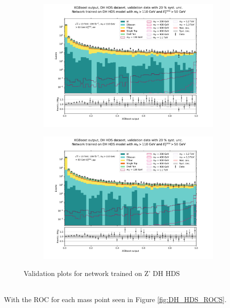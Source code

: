 \documentclass[14pt, a4paper]{book}
\begin{document}
\begin{figure}[!ht]
	\centering
	\begin{subfigure}[b]{0.49\textwidth}
      \centering
      \includegraphics[width=1\textwidth]{XGBoost/DH_HDS/VAL_ee.pdf}
      \end{subfigure}
   \hfill
   \begin{subfigure}[b]{0.49\textwidth}
      \centering
      \includegraphics[width=1\textwidth]{XGBoost/DH_HDS/VAL_uu.pdf}
      \end{subfigure}
   \caption{Validation plots for network trained on Z' DH HDS}\label{fig:DH_HDS_vals}
\end{figure}
\\With the ROC for each mass point seen in Figure \ref{fig:DH_HDS_ROCS}.
\end{document}
